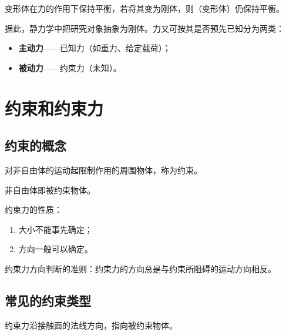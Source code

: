 \begin{axiom}[刚体原理]
变形体在力的作用下保持平衡，若将其变为刚体，则（变形体）仍保持平衡。
\end{axiom}

据此，静力学中把研究对象抽象为刚体。力又可按其是否预先已知分为两类：
\begin{itemize}
  \item \textbf{主动力}——已知力（如重力、给定载荷）；
  \item \textbf{被动力}——约束力（未知）。
\end{itemize}


\section{约束和约束力}

\subsection{约束的概念}

\begin{definition}[约束]
对非自由体的运动起限制作用的周围物体，称为约束。
\end{definition}

\begin{note}
非自由体即被约束物体。
\end{note}

约束力的性质：
\begin{enumerate}
  \item 大小不能事先确定；
  \item 方向一般可以确定。
\end{enumerate}

\begin{keybox}
约束力方向判断的准则：约束力的方向总是与约束所阻碍的运动方向相反。
\end{keybox}

\subsection{常见的约束类型}


约束力沿接触面的法线方向，指向被约束物体。


